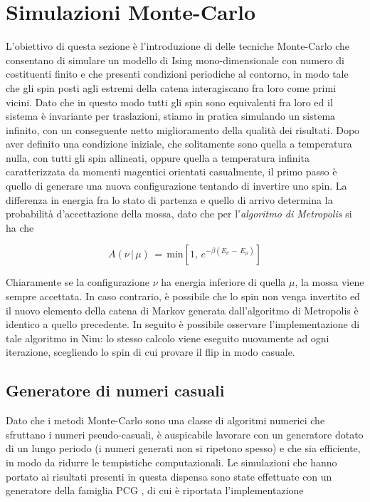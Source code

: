 \section{Simulazioni Monte-Carlo}

L'obiettivo di questa sezione è l'introduzione di delle tecniche Monte-Carlo che consentano di simulare un modello di Ising mono-dimensionale con 
numero di costituenti finito e che presenti condizioni periodiche al contorno, in modo tale che gli spin posti agli estremi della catena 
interagiscano fra loro come primi vicini. Dato che in questo modo tutti gli spin sono equivalenti fra loro ed il sistema è invariante per 
traslazioni, stiamo in pratica simulando un sistema infinito, con un conseguente netto miglioramento della qualità dei risultati. 
Dopo aver definito una condizione iniziale, che solitamente sono quella a temperatura nulla, con tutti gli spin allineati, oppure 
quella a temperatura infinita caratterizzata da momenti magentici orientati casualmente, il primo passo è quello di generare una 
nuova configurazione tentando di invertire uno spin. La differenza in energia fra lo stato di partenza e quello di arrivo determina 
la probabilità d'accettazione della mossa, dato che per l'\textit{algoritmo di Metropolis} \cite{M(RT)2} si ha che 

\begin{equation}
    A\left(\nu\,|\,\mu\right)\,=\,\text{min}\left[1,\,e^{-\beta\left(E_{\nu}\,-\,E_{\mu}\right)}\right]
    \label{eq: Metropolis_1D}
\end{equation}

Chiaramente se la configurazione $\nu$ ha energia inferiore di quella $\mu$, la mossa viene sempre accettata. In caso contrario, è 
possibile che lo spin non venga invertito ed il nuovo elemento della catena di Markov generata dall'algoritmo di Metropolis è identico 
a quello precedente. In seguito è possibile osservare l'implementazione di tale algoritmo in Nim: lo stesso calcolo viene eseguito 
nuovamente ad ogni iterazione, scegliendo lo spin di cui provare il flip in modo casuale.



\subsection{Generatore di numeri casuali}

Dato che i metodi Monte-Carlo sono una classe di algoritmi numerici che sfruttano i numeri pseudo-casuali, è auspicabile lavorare 
con un generatore dotato di un lungo periodo (i numeri generati non si ripetono spesso) e che sia efficiente, in modo da ridurre le 
tempistiche computazionali. Le simulazioni che hanno portato ai risultati presenti in questa dispensa sono state effettuate con un 
generatore della famiglia PCG \cite{pcg2014}, di cui è riportata l'implementazione



